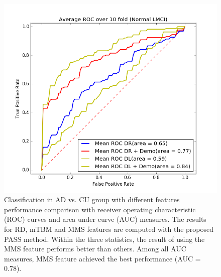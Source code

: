 \begin{figure}
	\centering
	\includegraphics[width=\linewidth]{figures/CU_LMCI}
	\caption[ROC for Normal vs. LMCI]{Classification in AD vs. CU group with different features performance comparison with receiver operating characteristic (ROC) curves and area under curve (AUC) measures. The results for RD, mTBM and MMS features are computed with the proposed PASS method. Within the three statistics, the result of using the MMS feature performs better than others. Among all AUC measures, MMS feature achieved the best performance (AUC = 0.78).}
	\label{fig:culmci}
\end{figure}

